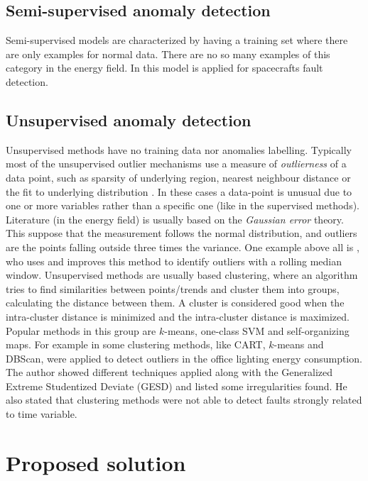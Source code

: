 \documentclass{sig-alternate-sigmod07}
\begin{document}
\subsection{Semi-supervised anomaly detection}
Semi-supervised models are characterized by having a training set where there are only examples for normal data. There are no so many examples of this category in the energy field. In \cite{fujimaki2005approach} this model is applied for spacecrafts fault detection. 


\subsection{Unsupervised anomaly detection}
\label{sec:unsupervised}
Unsupervised methods have no training data nor anomalies labelling. Typically most of the unsupervised outlier mechanisms use a measure of \emph{outlierness} of a data point, such as sparsity of underlying region, nearest neighbour distance or the fit to underlying distribution \cite{aggarwal2013outlier}. In these cases a data-point is unusual due to one or more variables rather than a specific one (like in the supervised methods). Literature (in the energy field) is usually based on the \emph{Gaussian error} theory. This suppose that the measurement follows the normal distribution, and outliers are the points falling outside three times the variance. One example above all is \cite{ferdowsi2013neural}, who uses and improves this method to identify outliers with a rolling median window.
Unsupervised methods are usually based clustering, where an algorithm tries to find similarities between points/trends and cluster them into groups, calculating the distance between them. A cluster is considered good when the intra-cluster distance is minimized and the intra-cluster distance is maximized. Popular methods in this group are $k$-means, one-class SVM and self-organizing maps. For example in \cite{khan2013fault} some clustering methods, like CART, $k$-means and DBScan, were applied to detect outliers in the office lighting energy consumption. The author showed different techniques applied along with the Generalized Extreme Studentized Deviate (GESD) and listed some irregularities found. He also stated that clustering methods were not able to detect faults strongly related to time variable. 






\section{Proposed solution}
\label{sec:proposedSolution} 
\end{document}
